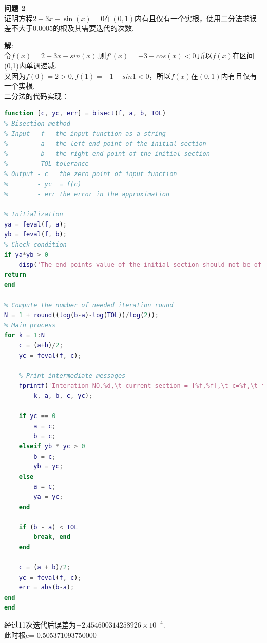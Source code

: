 \documentclass[UTF8]{ctexart}
\newenvironment{problem}[2][问题]
{\begin{mdframed}[backgroundcolor=gray!20] \textbf{#1 #2} \\}
	{\end{mdframed}}
\begin{document}
\begin{problem}{2}
	证明方程$2-3 x-\sin (x)=0$在$(0,1)$内有且仅有一个实根，使用二分法求误差不大于$0.0005$的根及其需要迭代的次数.
\end{problem}
\textbf{解}:\\
令$f(x)=2-3x-sin(x)$,则$f'(x)=-3-cos(x)<0$,所以$f(x)$在区间(0,1)内单调递减. \\
又因为$f(0)=2>0,f(1)=-1-sin1<0$，所以$f(x)$在$(0,1)$内有且仅有一个实根.\\
二分法的代码实现：
\begin{lstlisting}[language=matlab]
function [c, yc, err] = bisect(f, a, b, TOL)
% Bisection method
% Input - f   the input function as a string
%       - a   the left end point of the initial section
%       - b   the right end point of the initial section
%       - TOL tolerance
% Output - c   the zero point of input function
%        - yc  = f(c)
%        - err the error in the approximation

% Initialization
ya = feval(f, a);
yb = feval(f, b);
% Check condition
if ya*yb > 0
	disp('The end-points value of the initial section should not be of the same sign');
return
end

% Compute the number of needed iteration round
N = 1 + round((log(b-a)-log(TOL))/log(2));
% Main process
for k = 1:N
	c = (a+b)/2;
	yc = feval(f, c);

	% Print intermediate messages
	fprintf('Interation NO.%d,\t current section = [%f,%f],\t c=%f,\t f(c)=%f\n',...
		k, a, b, c, yc);

	if yc == 0
		a = c;
		b = c;
	elseif yb * yc > 0
		b = c;
		yb = yc;
	else
		a = c;
		ya = yc;
	end

	if (b - a) < TOL
		break, end
	end

	c = (a + b)/2;
	yc = feval(f, c);
	err = abs(b-a);
end
end
\end{lstlisting}\label{bisect}
经过11次迭代后误差为$-2.454600314258926\times 10^{-4}$.\\
此时根c= 0.505371093750000\\
\end{document}
